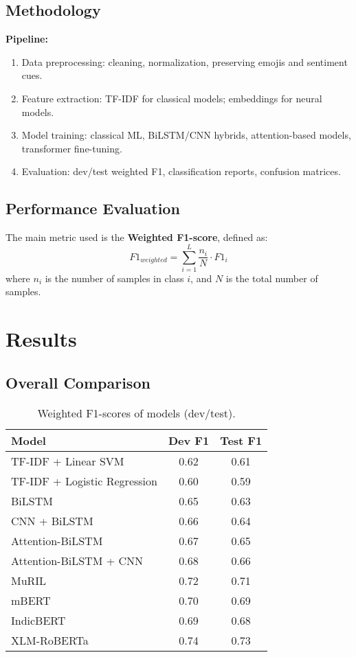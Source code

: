 \documentclass[12pt,a4paper]{article}
\begin{document}
\subsection{Methodology}
\textbf{Pipeline:}
\begin{enumerate}
    \item Data preprocessing: cleaning, normalization, preserving emojis and sentiment cues.
    \item Feature extraction: TF-IDF for classical models; embeddings for neural models.
    \item Model training: classical ML, BiLSTM/CNN hybrids, attention-based models, transformer fine-tuning.
    \item Evaluation: dev/test weighted F1, classification reports, confusion matrices.
\end{enumerate}

\subsection{Performance Evaluation}
The main metric used is the \textbf{Weighted F1-score}, defined as:
\[
F1_{weighted} = \sum_{i=1}^{L} \frac{n_i}{N} \cdot F1_i
\]
where $n_i$ is the number of samples in class $i$, and $N$ is the total number of samples.

\section{Results}
\subsection{Overall Comparison}
\begin{table}[h]
\centering
\caption{Weighted F1-scores of models (dev/test).}
\begin{tabular}{lcc}
\toprule
Model & Dev F1 & Test F1 \\
\midrule
TF-IDF + Linear SVM & 0.62 & 0.61 \\
TF-IDF + Logistic Regression & 0.60 & 0.59 \\
BiLSTM & 0.65 & 0.63 \\
CNN + BiLSTM & 0.66 & 0.64 \\
Attention-BiLSTM & 0.67 & 0.65 \\
Attention-BiLSTM + CNN & 0.68 & 0.66 \\
MuRIL & 0.72 & 0.71 \\
mBERT & 0.70 & 0.69 \\
IndicBERT & 0.69 & 0.68 \\
XLM-RoBERTa & 0.74 & 0.73 \\
\bottomrule
\end{tabular}
\end{table}
\end{document}
